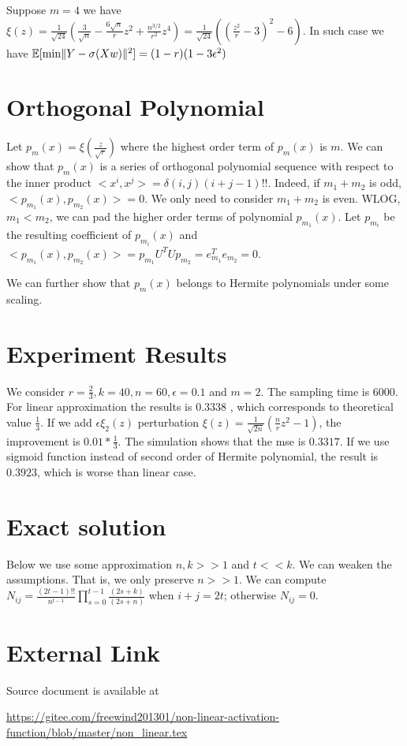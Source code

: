 \documentclass{article}
\DeclarePairedDelimiter\norm{\lVert}{\rVert}
\def\E{\mathbb{E}}
\begin{document}
Suppose  $ m = 4$ we have $ \xi(z) = \frac{1}{\sqrt{24}}(\frac{3}{\sqrt{n}} - \frac{6\sqrt{n}}{r} z^2 + \frac{n^{3/2}}{r^2}z^4)  = \frac{1}{\sqrt{24}}((\frac{z^2}{r} - 3)^2 - 6)$. In such case we have $\E[\min \norm{Y - \sigma(Xw)}^2]=(1-r)(1-3\epsilon^2)$
\section{Orthogonal Polynomial}
Let $p_m(x) = \xi(\frac{z}{\sqrt{r}})$ where the highest order term of $p_m(x)$ is $m$. We can show that $p_m(x)$ is a series of orthogonal polynomial sequence with respect to the inner product 
$<x^i, x^j> = \delta(i,j)(i+j-1)!!$. Indeed, if $m_1 + m_2$ is odd, $<p_{m_1}(x), p_{m_2}(x)> = 0$.
We only need to consider $m_1 + m_2$ is even. WLOG, $m_1 < m_2$, we can pad the higher order terms of polynomial $p_{m_1}(x)$. Let $p_{m_i}$ be the resulting coefficient of $p_{m_i}(x)$
and $<p_{m_1}(x), p_{m_2}(x)> = p_{m_1}U^TUp_{m_2} = e^T_{m_1} e_{m_2} = 0$.

We can further show that $p_m(x)$ belongs to Hermite polynomials under some scaling.

\section{Experiment Results}
We consider $r=\frac{2}{3}, k=40, n=60, \epsilon=0.1$ and $m=2$. The sampling time is 6000.
For linear approximation the results is $0.3338$ ,  which corresponds to theoretical value $\frac{1}{3}$. 
If we add $\epsilon \xi_2(z)$ perturbation $\xi(z) = \frac{1}{\sqrt{2n}}(\frac{n}{r} z^2 -1)$, the improvement is $0.01 * \frac{1}{3}$. The simulation shows that the mse is $0.3317$. If we use sigmoid function instead of second order of Hermite polynomial, the result is $0.3923$, which is worse than linear case.

\section{Exact solution}
Below we use some approximation $n, k >> 1$ and $ t << k$. 
We can weaken the assumptions. That is, we only preserve $ n >> 1$.
We can compute $N_{ij} =\frac{(2t-1)!!}{n^{t-1}} \prod_{s=0}^{t-1} \frac{(2s+k)}{(2s+n)}$ when $i+j = 2t$; otherwise $N_{ij}=0$.
\section{External Link}
Source document is available at 

\url{https://gitee.com/freewind201301/non-linear-activation-function/blob/master/non_linear.tex}
\end{document}
